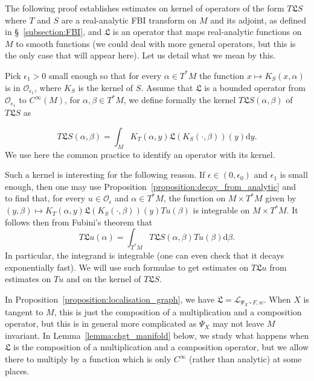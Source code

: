 \documentclass[AHL,Unicode,longabstracts,published]{cedram}
\newcommand{\clO}{\mathcal{O}}
\newcommand{\clL}{\mathcal{L}}
\newcommand{\fkL}{\mathfrak{L}}
\newcommand{\rmd}{\mathrm{d}}
\newcommand{\clO}{\mathcal{O}}
\begin{document}
\begin{rema}\label{remark:meaning_kernel}
The following proof establishes estimates on kernel of operators of the form $T \fkL S$ where $T$ and $S$ are a real-analytic FBI transform on $M$ and its adjoint, as defined in \S~\ref{subsection:FBI}, and $\fkL$ is an operator that maps real-analytic functions on $M$ to smooth functions (we could deal with more general operators, but this is the only case that will appear here). Let us detail what we mean by this.

Pick $\epsilon_1 > 0$ small enough so that for every $\alpha \in T^* M$ the function $x \mapsto K_S(x,\alpha)$ is in $\clO_{\epsilon_1}$, where $K_S$ is the kernel of $S$. Assume that $\fkL$ is a bounded operator from $\clO_{\epsilon_1}$ to $C^\infty(M)$, for $\alpha,\beta \in T^* M$, we define formally the kernel $T \fkL S (\alpha,\beta)$ of $T\fkL S$ as

\begin{equation*}
T\fkL S(\alpha,\beta) = \int_M K_T(\alpha,y) \fkL(K_S(\cdot,\beta))(y) \rmd y.
\end{equation*}
We use here the common practice to identify an operator with its kernel.

Such a kernel is interesting for the following reason. If $\epsilon \in (0,\epsilon_0)$ and $\epsilon_1$ is small enough, then one may use Proposition~\ref{proposition:decay_from_analytic} and~\cite[Lemma~2.5]{BJ20} to find that, for every $u \in \clO_\epsilon$ and $\alpha \in T^* M$, the function on $M \times T^* M$ given by $(y,\beta) \mapsto K_T(\alpha,y) \fkL(K_S(\cdot,\beta))(y) Tu(\beta)$ is integrable on $M \times T^* M$. It follows then from Fubini's theorem that
\begin{equation}\label{eq:usage_kernel}
T \fkL u(\alpha) = \int_{T^* M} T\fkL S(\alpha,\beta) Tu(\beta) \rmd \beta.
\end{equation}
In particular, the integrand is integrable (one can even check that it decays exponentially fast). We will use such formulae to get estimates on $T\fkL u$ from estimates on $Tu$ and on the kernel of $T\fkL S$.

In Proposition~\ref{proposition:localisation_graph}, we have $\fkL = \clL_{\Psi_X \circ F, w}$. When $X$ is tangent to $M$, this is just the composition of a multiplication and a composition operator, but this is in general more complicated as $\Psi_X$ may not leave $M$ invariant. In Lemma~\ref{lemma:chgt_manifold} below, we study what happens when $\fkL$ is the composition of a multiplication and a composition operator, but we allow there to multiply by a function which is only $C^\infty$ (rather than analytic) at some places.
\end{rema}
\end{document}
